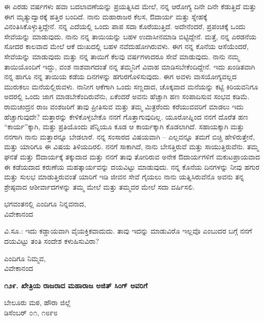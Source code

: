 ಈ ಎರಡು ವರ್ಷಗಳು ಹವಾ ಬದಲಾವಣೆಯನ್ನು ಪ್ರಯತ್ನಿಸಿದ ಮೇಲೆ, ನನ್ನ ಆರೋಗ್ಯ ದಿನೇ ದಿನೇ ಕೆಡುತ್ತಿದೆ ಮತ್ತು ಈಗ ಮೃತ್ಯುದ್ವಾರಕ್ಕೆ ಹತ್ತಿರ ಬಂದಿದೆ. ನಾನು ಮಹಾರಾಜರ ಕೆಲಸ, ಔದಾರ್ಯ ಮತ್ತು ಸ್ನೇಹಕ್ಕೆ ವಿನಂತಿಸಿಕೊಳ್ಳುತ್ತಿದ್ದೇನೆ. ನನ್ನ ಎದೆಯಲ್ಲಿ ಒಂದು ಪಾಪ ಸದಾ ಕೊರೆಯುತ್ತಿದೆ. ಅದೇನೆಂದರೆ, ಪ್ರಪಂಚಕ್ಕೆ ಒಂದು ಸೇವೆಯನ್ನು ಮಾಡುವುದು. ನಾನು ನನ್ನ ತಾಯಿಯನ್ನು ಬಹಳ ಉದಾಸೀನಮಾಡಿ ಬಿಟ್ಟಿದ್ದೇನೆ. ಮತ್ತೆ, ನನ್ನ ಎರಡನೆಯ ಸೋದರ ಕಾಲವಾದ ಮೇಲೆ ಆಕೆ ದುಃಖದಲ್ಲಿ ಬಹಳ ನವೆದುಹೋಗಿರುವಳು. ಈಗ ನನ್ನ ಕೊನೆಯ ಆಸೆಯೆಂದರೆ, ಸೇವೆಯನ್ನು ಮಾಡುವುದು ಮತ್ತು ನನ್ನ ತಾಯಿಗೆ ಕೆಲವು ವರ್ಷಗಳಾದರೂ ಸೇವೆ ಮಾಡುವುದು. ನಾನು ನಮ್ಮ ತಾಯಿಯೊಂದಿಗೆ ಇದ್ದು, ವಂಶ ನಾಶವಾಗದಂತೆ ನನ್ನ ತಮ್ಮನಿಗೆ ವಿವಾಹ ಮಾಡಿಸಬೇಕೆಂದಿದ್ದೇನೆ. ಇದು ಖಂಡಿತವಾಗಿ ನನ್ನ ಹಾಗೂ ನನ್ನ ತಾಯಿಯ ಕಡೆಯ ದಿನಗಳನ್ನು ಹಗುರಗೊಳಿಸುವುದು. ಈಗ ಅವಳು ವಾಸಯೋಗ್ಯವಲ್ಲದ ಮುರುಕಲು ಮನೆಯಲ್ಲಿರುವಳು. ನಾನೀಗ ಆಕೆಗಾಗಿ ಒಂದು ಸಣ್ಣದಾದ, ಚೊಕ್ಕವಾದ ಮನೆಯನ್ನು ಕಟ್ಟಿ ಕಿರಿಯವನಿಗೂ ಅದರಲ್ಲಿ ಒಂದು ಜಾಗ ಮಾಡಬೇಕೆಂದಿರುವೆನು, ಏಕೆಂದರೆ ಅವನು ಹೆಚ್ಚಾಗಿ ಹಣ ಸಂಪಾದಿಸುವ ಸಂಭವ ಕಡಿಮೆ. ರಾಮಚಂದ್ರನ ರಾಜ ವಂಶಜರಿಗೆ ತಾವು ಪ್ರೀತಿಸುವ ಮತ್ತು ತಮ್ಮ ಮಿತ್ರರೆಂದು ಕರೆಯುವವರಿಗೆ ಮಾಡಲು ಇದು ಹೆಚ್ಚಾಗುವುದೇ? ಮತ್ತಾರನ್ನು ಕೇಳಿಕೊಳ್ಳಬೇಕೊ ನನಗೆ ಗೊತ್ತಾಗುವುದಿಲ್ಲ. ಯೂರೋಪ್ನಿಂದ ನನಗೆ ದೊರೆತ ಹಣ “ಕಾರ್ಯ”ಕ್ಕಾಗಿ, ಮತ್ತು ಪ್ರತಿಯೊಂದು ಪೆನ್ನಿಯೂ ಕೂಡ ಆ ಕಾರ್ಯಕ್ಕಾಗಿ ಕೊಡಲಾಗಿದೆ. ಸಹಾಯಕ್ಕಾಗಿ ಮತ್ತು ನನಗಾಗಿ ನಾನು ಮತ್ತಾರನ್ನೂ ಬೇಡಲಾರೆ. ನನ್ನ ಸಂಸಾರದ ವಿಷಯವಾಗಿ – ಎಲ್ಲವನ್ನೂ ತಮಗೆ ಬಿಚ್ಚಿ ಹೇಳಿರುತ್ತೇನೆ, ಮತ್ತು ಯಾರಿಗೂ ಈ ವಿಷಯ ತಿಳಿಯದಿರಲಿ. ನನಗೆ ಸಾಕಾಗಿದೆ, ನಾನು ಬೇಸತ್ತಿರುವೆ ಮತ್ತು ಸಾಯುತ್ತಿರುವೆನು. ತಮ್ಮ ಘನತೆ ಮತ್ತು ಔದಾರ್ಯಕ್ಕೆ ತಕ್ಕುದಾದ ಮತ್ತು ನನಗೆ ತಾವು ತೋರಿರುವ ಅನೇಕ ಔದಾರ್ಯಗಳಿಗೆ ಮಕುಟಪ್ರಾಯವಾದ ಈ ಕಡೆಯದಾದ ಕರುಣೆಯ ಮಹತ್ಕಾರ್ಯವನ್ನು ದಯವಿಟ್ಟು ಮಾಡುವುದು. ನನ್ನ ಕೊನೆಯ ದಿನಗಳನ್ನು ನೀವು ಹಗುರ ಮತ್ತು ಸುಲಭ ಮಾಡುತ್ತಿರುವಂತೆ ಯಾರಿಗೆ ಇಡಿ ಜೀವನ ಸೇವೆ ಗೈಯಲು ನಾನು ಯತ್ನಿಸಿರುವೆನೊ ಅವನು ತನ್ನ ಶ್ರೇಷ್ಠವಾದ ಆಶೀರ್ವಾದಗಳನ್ನು ತಮ್ಮ ಮೇಲೆ ಮತ್ತು ತಮ್ಮವರ ಮೇಲೆ ಸದಾ ವರ್ಷಿಸಲಿ.

\begin{flushright}
ಭಗವಂತನಲ್ಲಿ ಎಂದಿಗೂ ನಿನ್ನವನಾದ,\\ವಿವೇಕಾನಂದ
\end{flushright}

ವಿ.ಸೂ.: ಇದು ಕಡ್ಡಾಯವಾಗಿ ವೈಯಕ್ತಿಕವಾದುದು. ತಾವು ಇದನ್ನು ಮಾಡುವಿರೊ ಇಲ್ಲವೊ ಎಂಬುದರ ಬಗ್ಗೆ ನನಗೆ ದಯವಿಟ್ಟು ತಂತಿ ಸಂದೇಶ ಕಳುಹಿಸುವಿರಾ?

\begin{flushright}
ಎಂದಿಗೂ ನಿಮ್ಮವ,\\ವಿವೇಕಾನಂದ
\end{flushright}

\begin{center}
\textbf{೧೨೯. ಖೇತ್ರಿಯ ರಾಜರಾದ ಮಹಾರಾಜ ಅಜಿತ್ ಸಿಂಗ್ ಅವರಿಗೆ}
\end{center}

\begin{flushright}
ಬೇಲೂರು ಮಠ, ಹೌರಾ ಜಿಲ್ಲೆ\\ಡಿಸೆಂಬರ್ ೦೧, ೧೮೯೮
\end{flushright}

